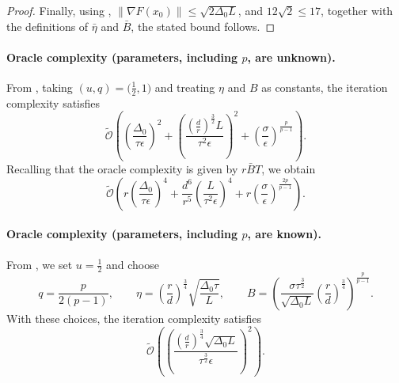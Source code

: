 \documentclass[10pt]{article}
\begin{document}
\begin{proof}
Finally, using ,
$\|\nabla F(x_0)\|\le \sqrt{2\Delta_0L}$,
and $12\sqrt{2}\le17$, together with the definitions of
$\bar{\eta}$ and $\bar{B}$, the stated bound follows.
\end{proof}



\paragraph{Oracle complexity (parameters, including $p$, are unknown).}
From , taking $(u,q)=\bigl(\tfrac12,1\bigr)$ and treating $\eta$ and $B$ as constants,
the iteration complexity satisfies 
\[
\tilde{\mathcal{O}}\!\left(
\left(\frac{\Delta_0}{\tau \epsilon}\right)^{2}
+
\left(\frac{\left(\frac{d}{r}\right)^{\frac{3}{2}}L}{\tau^2 \epsilon}\right)^{2}
+
\left(\frac{\sigma}{\epsilon}\right)^{\frac{p}{p-1}}
\right).
\]
Recalling that the oracle complexity is given by $r\bar{B}T$,
we obtain
\[
\tilde{\mathcal{O}}\!\left(
  r\left(\frac{\Delta_0}{\tau\epsilon}\right)^4
  +
  \frac{d^6}{r^5}\left(\frac{L}{\tau^2 \epsilon}\right)^4
  +
  r\left(\frac{\sigma}{\epsilon}\right)^{\frac{2p}{p-1}}
\right).
\]

\paragraph{Oracle complexity (parameters, including $p$, are known).}
From , we set $u=\tfrac{1}{2}$ and choose
\[
q=\frac{p}{2(p-1)},\qquad
\eta=\left(\frac{r}{d}\right)^{\frac{3}{4}}
\sqrt{\frac{\Delta_0 \tau}{L}},\qquad
B=\left(
\frac{\sigma \tau^{\frac{3}{2}}}{\sqrt{\Delta_0 L}}
\left(\frac{r}{d}\right)^{\frac{3}{4}}
\right)^{\frac{p}{p-1}}.
\]
With these choices, the iteration complexity satisfies 
\[
\tilde{\mathcal{O}}\!\left(
  \left(\frac{\left(\frac{d}{r}\right)^{\frac{3}{4}}\sqrt{\Delta_0L}}{\tau^{\frac{3}{2}} \epsilon}\right)^{2}
\right).
\]
\end{document}
